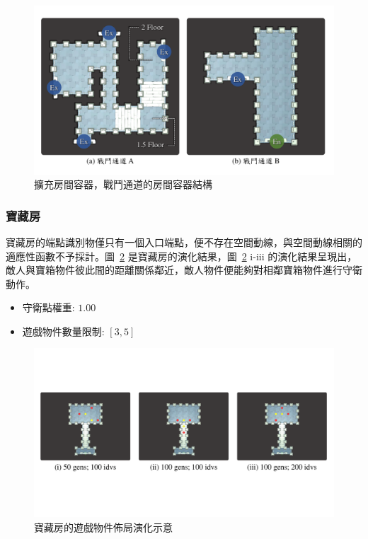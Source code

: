 \begin{figure}[!htb]
  \begin{center}
    \includegraphics[width=1.0\textwidth]{figures/roomtype-mainpath-extend.pdf}
    \caption{擴充房間容器，戰鬥通道的房間容器結構}
    \label{fig:roomtype-mainpath-extend}
  \end{center}
\end{figure}

\subsubsection{寶藏房}
\label{sssec:method-segments-appliedonvolumes-treasure}

寶藏房的端點識別物僅只有一個入口端點，便不存在空間動線，與空間動線相關的適應性函數不予採計。圖~\ref{fig:applied-ga-on-volume-treasure} 是寶藏房的演化結果，圖~\ref{fig:applied-ga-on-volume-treasure} i-iii 的演化結果呈現出，敵人與寶箱物件彼此間的距離關係鄰近，敵人物件便能夠對相鄰寶箱物件進行守衛動作。

\begin{itemize}
  \setlength\itemsep{-0.5em}
  \item 守衛點權重: $1.00$
  \item 遊戲物件數量限制: $[3, 5]$
\end{itemize}

\begin{figure}[H]
  \begin{center}
    \includegraphics[width=1.0\textwidth]{figures/applied-ga-on-volume-treasure.pdf}
    \caption{寶藏房的遊戲物件佈局演化示意} 
    \label{fig:applied-ga-on-volume-treasure}
  \end{center}
\end{figure}

